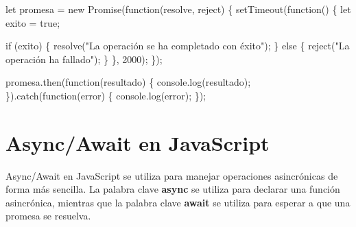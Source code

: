 \documentclass[
  a4paper,
  DIV=11,
  numbers=noendperiod,
  onepage,
  openany]{scrreprt}
\newenvironment{Shaded}{\begin{snugshade}}{\end{snugshade}}
\newcommand{\BuiltInTok}[1]{\textcolor[rgb]{0.00,0.23,0.31}{#1}}
\newcommand{\ControlFlowTok}[1]{\textcolor[rgb]{0.00,0.23,0.31}{#1}}
\newcommand{\DecValTok}[1]{\textcolor[rgb]{0.68,0.00,0.00}{#1}}
\newcommand{\FunctionTok}[1]{\textcolor[rgb]{0.28,0.35,0.67}{#1}}
\newcommand{\KeywordTok}[1]{\textcolor[rgb]{0.00,0.23,0.31}{#1}}
\newcommand{\NormalTok}[1]{\textcolor[rgb]{0.00,0.23,0.31}{#1}}
\newcommand{\OperatorTok}[1]{\textcolor[rgb]{0.37,0.37,0.37}{#1}}
\newcommand{\PreprocessorTok}[1]{\textcolor[rgb]{0.68,0.00,0.00}{#1}}
\newcommand{\StringTok}[1]{\textcolor[rgb]{0.13,0.47,0.30}{#1}}
\begin{document}
\begin{Shaded}
\begin{Highlighting}[]
\KeywordTok{let}\NormalTok{ promesa }\OperatorTok{=} \KeywordTok{new} \BuiltInTok{Promise}\NormalTok{(}\KeywordTok{function}\NormalTok{(resolve}\OperatorTok{,}\NormalTok{ reject) \{}
    \PreprocessorTok{setTimeout}\NormalTok{(}\KeywordTok{function}\NormalTok{() \{}
        \KeywordTok{let}\NormalTok{ exito }\OperatorTok{=} \KeywordTok{true}\OperatorTok{;}

        \ControlFlowTok{if}\NormalTok{ (exito) \{}
            \FunctionTok{resolve}\NormalTok{(}\StringTok{"La operación se ha completado con éxito"}\NormalTok{)}\OperatorTok{;}
\NormalTok{        \} }\ControlFlowTok{else}\NormalTok{ \{}
            \FunctionTok{reject}\NormalTok{(}\StringTok{"La operación ha fallado"}\NormalTok{)}\OperatorTok{;}
\NormalTok{        \}}
\NormalTok{    \}}\OperatorTok{,} \DecValTok{2000}\NormalTok{)}\OperatorTok{;}
\NormalTok{\})}\OperatorTok{;}

\NormalTok{promesa}\OperatorTok{.}\FunctionTok{then}\NormalTok{(}\KeywordTok{function}\NormalTok{(resultado) \{}
    \BuiltInTok{console}\OperatorTok{.}\FunctionTok{log}\NormalTok{(resultado)}\OperatorTok{;}
\NormalTok{\})}\OperatorTok{.}\FunctionTok{catch}\NormalTok{(}\KeywordTok{function}\NormalTok{(error) \{}
    \BuiltInTok{console}\OperatorTok{.}\FunctionTok{log}\NormalTok{(error)}\OperatorTok{;}
\NormalTok{\})}\OperatorTok{;}
\end{Highlighting}
\end{Shaded}

\section{Async/Await en JavaScript}\label{asyncawait-en-javascript}

Async/Await en JavaScript se utiliza para manejar operaciones
asincrónicas de forma más sencilla. La palabra clave \textbf{async} se
utiliza para declarar una función asincrónica, mientras que la palabra
clave \textbf{await} se utiliza para esperar a que una promesa se
resuelva.
\end{document}
